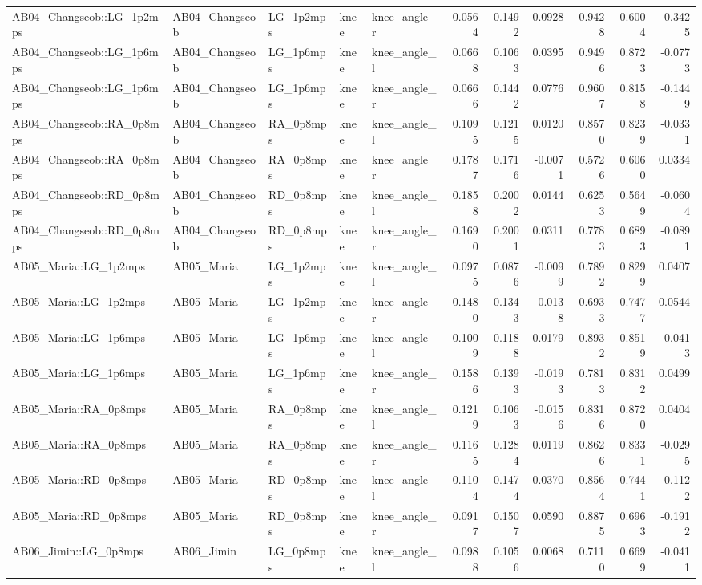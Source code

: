 \begin{table}
\begin{tabular}{lllllrrrrrr}
AB04_Changseob::LG_1p2mps & AB04_Changseob & LG_1p2mps & knee & knee_angle_r & 0.0564 & 0.1492 & 0.0928 & 0.9428 & 0.6004 & -0.3425 \\
AB04_Changseob::LG_1p6mps & AB04_Changseob & LG_1p6mps & knee & knee_angle_l & 0.0668 & 0.1063 & 0.0395 & 0.9496 & 0.8723 & -0.0773 \\
AB04_Changseob::LG_1p6mps & AB04_Changseob & LG_1p6mps & knee & knee_angle_r & 0.0666 & 0.1442 & 0.0776 & 0.9607 & 0.8158 & -0.1449 \\
AB04_Changseob::RA_0p8mps & AB04_Changseob & RA_0p8mps & knee & knee_angle_l & 0.1095 & 0.1215 & 0.0120 & 0.8570 & 0.8239 & -0.0331 \\
AB04_Changseob::RA_0p8mps & AB04_Changseob & RA_0p8mps & knee & knee_angle_r & 0.1787 & 0.1716 & -0.0071 & 0.5726 & 0.6060 & 0.0334 \\
AB04_Changseob::RD_0p8mps & AB04_Changseob & RD_0p8mps & knee & knee_angle_l & 0.1858 & 0.2002 & 0.0144 & 0.6253 & 0.5649 & -0.0604 \\
AB04_Changseob::RD_0p8mps & AB04_Changseob & RD_0p8mps & knee & knee_angle_r & 0.1690 & 0.2001 & 0.0311 & 0.7783 & 0.6893 & -0.0891 \\
AB05_Maria::LG_1p2mps & AB05_Maria & LG_1p2mps & knee & knee_angle_l & 0.0975 & 0.0876 & -0.0099 & 0.7892 & 0.8299 & 0.0407 \\
AB05_Maria::LG_1p2mps & AB05_Maria & LG_1p2mps & knee & knee_angle_r & 0.1480 & 0.1343 & -0.0138 & 0.6933 & 0.7477 & 0.0544 \\
AB05_Maria::LG_1p6mps & AB05_Maria & LG_1p6mps & knee & knee_angle_l & 0.1009 & 0.1188 & 0.0179 & 0.8932 & 0.8519 & -0.0413 \\
AB05_Maria::LG_1p6mps & AB05_Maria & LG_1p6mps & knee & knee_angle_r & 0.1586 & 0.1393 & -0.0193 & 0.7813 & 0.8312 & 0.0499 \\
AB05_Maria::RA_0p8mps & AB05_Maria & RA_0p8mps & knee & knee_angle_l & 0.1219 & 0.1063 & -0.0156 & 0.8316 & 0.8720 & 0.0404 \\
AB05_Maria::RA_0p8mps & AB05_Maria & RA_0p8mps & knee & knee_angle_r & 0.1165 & 0.1284 & 0.0119 & 0.8626 & 0.8331 & -0.0295 \\
AB05_Maria::RD_0p8mps & AB05_Maria & RD_0p8mps & knee & knee_angle_l & 0.1104 & 0.1474 & 0.0370 & 0.8564 & 0.7441 & -0.1122 \\
AB05_Maria::RD_0p8mps & AB05_Maria & RD_0p8mps & knee & knee_angle_r & 0.0917 & 0.1507 & 0.0590 & 0.8875 & 0.6963 & -0.1912 \\
AB06_Jimin::LG_0p8mps & AB06_Jimin & LG_0p8mps & knee & knee_angle_l & 0.0988 & 0.1056 & 0.0068 & 0.7110 & 0.6699 & -0.0411 \\

\end{tabular}
\end{table}
